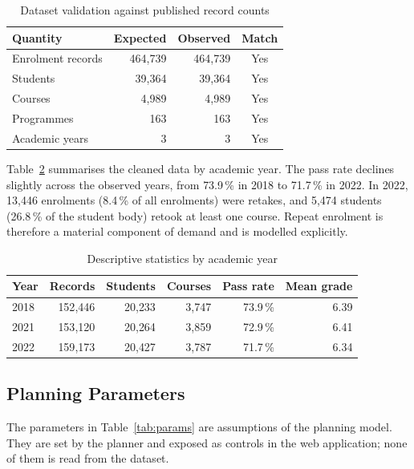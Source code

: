 \documentclass[conference]{IEEEtran}
\begin{document}
\begin{table}[htbp]
\caption{Dataset validation against published record counts}
\label{tab:valid}
\centering
\begin{tabular}{lrrc}
\toprule
Quantity & Expected & Observed & Match \\
\midrule
Enrolment records & 464{,}739 & 464{,}739 & Yes \\
Students          & 39{,}364  & 39{,}364  & Yes \\
Courses           & 4{,}989   & 4{,}989   & Yes \\
Programmes        & 163       & 163       & Yes \\
Academic years    & 3         & 3         & Yes \\
\bottomrule
\end{tabular}
\end{table}

Table~\ref{tab:eda} summarises the cleaned data by academic year. The pass rate declines
slightly across the observed years, from 73.9\,\% in 2018 to 71.7\,\% in 2022. In 2022,
13{,}446 enrolments (8.4\,\% of all enrolments) were retakes, and 5{,}474 students
(26.8\,\% of the student body) retook at least one course. Repeat enrolment is therefore
a material component of demand and is modelled explicitly.

\begin{table}[htbp]
\caption{Descriptive statistics by academic year}
\label{tab:eda}
\centering
\small
\begin{tabular}{lrrrrr}
\toprule
Year & Records & Students & Courses & Pass rate & Mean grade \\
\midrule
2018 & 152{,}446 & 20{,}233 & 3{,}747 & 73.9\,\% & 6.39 \\
2021 & 153{,}120 & 20{,}264 & 3{,}859 & 72.9\,\% & 6.41 \\
2022 & 159{,}173 & 20{,}427 & 3{,}787 & 71.7\,\% & 6.34 \\
\bottomrule
\end{tabular}
\end{table}

\subsection{Planning Parameters}

The parameters in Table~\ref{tab:params} are assumptions of the planning model. They are
set by the planner and exposed as controls in the web application; none of them is read
from the dataset.
\end{document}

